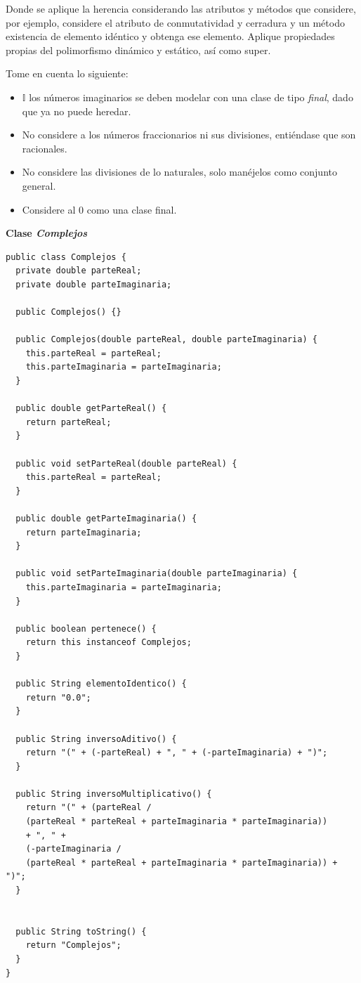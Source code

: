 \documentclass[11pt, twocolumn]{article}
\newcommand{\linejump}{\hfill \break}
\begin{document}
  Donde se aplique la herencia considerando las atributos y métodos que considere, por ejemplo, considere el atributo de conmutatividad y cerradura y un método existencia de elemento idéntico y obtenga ese elemento. Aplique propiedades propias del polimorfismo dinámico y estático, así como super.
  
  Tome en cuenta lo siguiente:
  \begin{itemize}
    \item $\mathbb{I}$ los números imaginarios se deben modelar con una clase de tipo \textit{final}, dado que ya no puede heredar.
    \item No considere a los números fraccionarios ni sus divisiones, entiéndase que son
    racionales.
    \item No considere las divisiones de lo naturales, solo manéjelos como conjunto general.
    \item Considere al 0 como una clase final.
  \end{itemize}

  \linejump  
  \textbf{Clase \textit{Complejos}}
  \begin{lstlisting}
public class Complejos {
  private double parteReal;
  private double parteImaginaria;

  public Complejos() {}

  public Complejos(double parteReal, double parteImaginaria) {
    this.parteReal = parteReal;
    this.parteImaginaria = parteImaginaria;
  }

  public double getParteReal() {
    return parteReal;
  }

  public void setParteReal(double parteReal) {
    this.parteReal = parteReal;
  }

  public double getParteImaginaria() {
    return parteImaginaria;
  }

  public void setParteImaginaria(double parteImaginaria) {
    this.parteImaginaria = parteImaginaria;
  }

  public boolean pertenece() {
    return this instanceof Complejos;
  }

  public String elementoIdentico() {
    return "0.0";
  }

  public String inversoAditivo() {
    return "(" + (-parteReal) + ", " + (-parteImaginaria) + ")";
  }

  public String inversoMultiplicativo() {
    return "(" + (parteReal / 
    (parteReal * parteReal + parteImaginaria * parteImaginaria)) 
    + ", " + 
    (-parteImaginaria / 
    (parteReal * parteReal + parteImaginaria * parteImaginaria)) + ")";
  }


  public String toString() {
    return "Complejos";
  }
}  
  \end{lstlisting}
\end{document}
